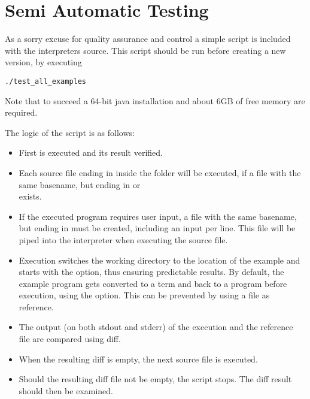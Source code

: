 \section{Semi Automatic Testing}\label{testing}

As a sorry excuse for quality assurance and control a simple  script is included with the interpreters source.
This script should be run before creating a new version, by executing

\begin{lstlisting}[frame=none,numbers=none]
./test_all_examples
\end{lstlisting}

Note that to succeed a 64-bit java installation and about 6GB of free memory are required.

The logic of the script is as follows:
\begin{itemize}
    \item First  is executed and its result verified.
    \item Each source file ending in  inside the  folder will be executed, if a file with the same basename, but ending in  or\\
      exists.
    \item If the executed program requires user input, a file with the same basename, but ending in  must be created, including an input per line. This file will be piped into the interpreter when executing the source file.
    \item Execution switches the working directory to the location of the example and starts \setlX{} with the
           option, thus ensuring predictable results. By default, the example program gets converted to a term and back to a program before execution, using the  option. This can be prevented by using a  file as reference.
    \item The output (on both stdout and stderr) of the execution and the reference file are compared using diff.
    \item When the resulting diff is empty, the next source file is executed.
    \item Should the resulting diff file not be empty, the script stops. The diff result should then be examined.
\end{itemize}

